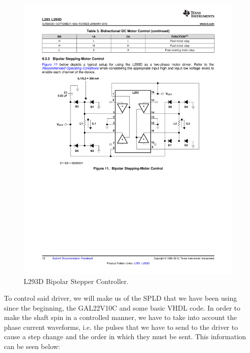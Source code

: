 \documentclass[a4paper, 11pt, oneside]{article}
\begin{document}
\begin{figure}[H]
    \centering
    \includegraphics[scale = 0.85]{Graphics/Practice 3/GRAPHICS/DATASHEETS/L293D_INTERNAL.pdf}
    \caption{L293D Bipolar Stepper Controller. ~\autocite{L293D}}
    \label{fig:L293D}
\end{figure}

To control said driver, we will make us of the SPLD that we have been using since the beginning, the GAL22V10C and some basic VHDL code. In order to make the shaft spin in a controlled manner, we have to take into account the phase current waveforms, i.e. the pulses that we have to send to the driver to cause a step change and the order in which they must be sent. This information can be seen below:

\vspace{0.3cm}
\end{document}
